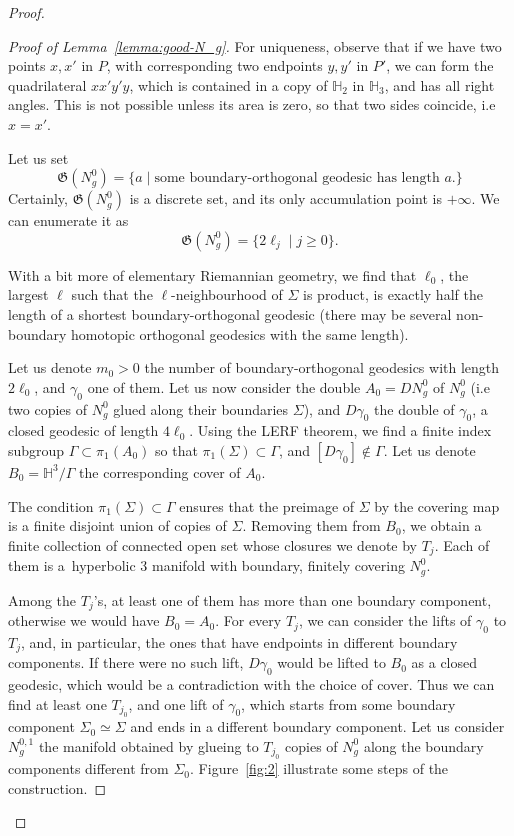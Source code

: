 \documentclass[10pt]{amsart}
\theoremstyle{definition}\newtheorem{defi}[theo]{Definition}\newtheorem{rema}[theo]{Remark}\newtheorem{exam}[theo]{Example}\newtheorem{exem}[theo]{Example}\newtheorem{nota}[theo]{Notation}
\newcommand{\Hh}{\mathbb{H}}
\newcommand{\fkG}{\mathfrak{G}}
\theoremstyle{plain}
\begin{document}
\begin{proof}
\begin{proof}[Proof of Lemma~\ref{lemma:good-N_g}]
For uniqueness, observe that if we have two points $x,x'$ in $P$, with corresponding two endpoints $y,y'$ in $P'$, we can form the quadrilateral $xx'y'y$, which is contained in a copy of $\Hh_2$ in $\Hh_3$, and has all right angles. This is not possible unless its area is zero, so that two sides coincide, i.e $x=x'$.

Let us set
\[
\fkG(N_g^0)= \{ a \mid \text{some boundary-orthogonal geodesic has length $a$.} \}
\]
Certainly, $\fkG(N_g^0)$ is a discrete set, and its only accumulation point is $+\infty$. We can enumerate it as
\[
\fkG(N_g^0)= \{ 2 \ell_j \mid j\geq 0\}.
\]

With a bit more of elementary Riemannian geometry, we find that $\ell_0$, the largest $\ell$ such that the $\ell$-neighbourhood of $\Sigma$ is product, is exactly half the length of a shortest boundary-orthogonal geodesic (there may be several non-boundary homotopic orthogonal geodesics with the same length).


Let us denote $m_0>0$ the number of boundary-orthogonal geodesics with length $2\ell_0$, and $\gamma_0$ one of them. Let us now consider the double $A_0 = DN_g^0$ of $N_g^0$ (i.e two copies of $N_g^0$ glued along their boundaries $\Sigma$), and $D\gamma_0$ the double of $\gamma_0$, a closed geodesic of length $4\ell_0$. Using the LERF theorem, we find a finite index subgroup $\Gamma\subset \pi_1(A_0)$ so that $\pi_1(\Sigma) \subset \Gamma$, and $[D\gamma_0]\notin \Gamma$. Let us denote $B_0 = \Hh^3/\Gamma$ the corresponding cover of $A_0$.

The condition $\pi_1(\Sigma)\subset \Gamma$ ensures that the preimage of $\Sigma$ by the covering map is a finite disjoint union of copies of $\Sigma$. Removing them from $B_0$, we obtain a finite collection of connected open set whose closures we denote by $T_j$. Each of them is a~hyperbolic 3 manifold with boundary, finitely covering $N_g^0$.

Among the $T_j$'s, at least one of them has more than one boundary component, otherwise we would have $B_0 = A_0$. For every $T_j$, we can consider the lifts of $\gamma_0$ to $T_j$, and, in particular, the ones that have endpoints in different boundary components. If there were no such lift, $D\gamma_0$ would be lifted to $B_0$ as a closed geodesic, which would be a contradiction with the choice of cover. Thus we can find at least one $T_{j_0}$, and one lift of $\gamma_0$, which starts from some boundary component $\Sigma_0 \simeq \Sigma$ and ends in a different boundary component. Let us consider $N_g^{0,1}$ the manifold obtained by glueing to $T_{j_0}$ copies of $N_g^0$ along the boundary components different from $\Sigma_0$. Figure~\ref{fig:2} illustrate some steps of the construction.


\end{proof}
\end{proof}
\end{document}

